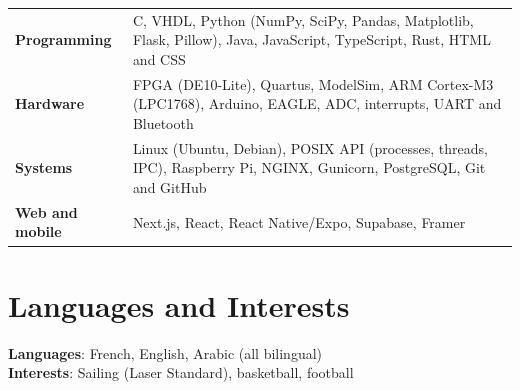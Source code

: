 \documentclass[10pt,a4paper]{article}
\begin{document}
\begin{tabularx}{\linewidth}{@{}lX@{}}
  \textbf{Programming}    & C, VHDL, Python (NumPy, SciPy, Pandas, Matplotlib, Flask, Pillow), Java, JavaScript, TypeScript, Rust, HTML and CSS \\[2pt]
  \textbf{Hardware}       & FPGA (DE10-Lite), Quartus, ModelSim, ARM Cortex-M3 (LPC1768), Arduino, \mbox{EAGLE}, ADC, interrupts, UART and Bluetooth \\[2pt]
  \textbf{Systems}        & Linux (Ubuntu, Debian), POSIX API (processes, threads, IPC), Raspberry Pi, NGINX, Gunicorn, PostgreSQL, Git and GitHub \\[2pt]
  \textbf{Web and mobile} & Next.js, React, React Native/Expo, Supabase, Framer \\
\end{tabularx}

\section*{Languages and Interests}

\textbf{Languages}: French, English, Arabic (all bilingual)\\
\textbf{Interests}: Sailing (Laser Standard), basketball, football
\end{document}
